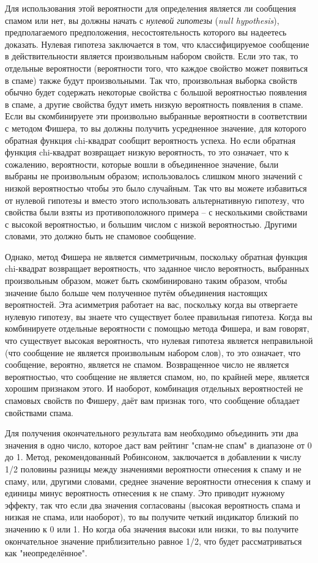 Для использования этой вероятности для определения является ли сообщения спамом или нет,
вы должны начать с \textit{нулевой гипотезы} (\textit{null hypothesis}), предполагаемого
предположения, несостоятельность которого вы надеетесь доказать. Нулевая гипотеза
заключается в том, что классифицируемое сообщение в действительности является произвольным
набором свойств.  Если это так, то отдельные вероятности (вероятности того, что каждое
свойство может появиться в спаме) также будут произвольными.  Так что, произвольная
выборка свойств обычно будет содержать некоторые свойства с большой вероятностью появления
в спаме, а другие свойства будут иметь низкую вероятность появления в спаме.  Если вы
скомбинируете эти произвольно выбранные вероятности в соответствии с методом Фишера, то вы
должны получить усредненное значение, для которого обратная функция chi-квадрат сообщит
вероятность успеха.  Но если обратная функция chi-квадрат возвращает низкую вероятность,
то это означает, что к сожалению, вероятности, которые вошли в объединенное значение, были
выбраны не произвольным образом; использовалось слишком много значений с низкой
вероятностью чтобы это было случайным. Так что вы можете избавиться от нулевой гипотезы и
вместо этого использовать альтернативную гипотезу, что свойства были взяты из
противоположного примера -- с несколькими свойствами с высокой вероятностью, и большим
числом с низкой вероятностью.  Другими словами, это должно быть не спамовое сообщение.

Однако, метод Фишера не является симметричным, поскольку обратная функция chi-квадрат
возвращает вероятность, что заданное число вероятность, выбранных произвольным образом,
может быть скомбинировано таким образом, чтобы значение было больше чем полученное путём
объединения настоящих вероятностей.  Эта асимметрия работает на вас, поскольку когда вы
отвергаете нулевую гипотезу, вы знаете что существует более правильная гипотеза.  Когда вы
комбинируете отдельные вероятности с помощью метода Фишера, и вам говорят, что существует
высокая вероятность, что нулевая гипотеза является неправильной (что сообщение не является
произвольным набором слов), то это означает, что сообщение, вероятно, является не спамом.
Возвращенное число не является вероятностью, что сообщение не является спамом, но, по
крайней мере, является хорошим признаком этого.  И наоборот, комбинация отдельных
вероятностей не спамовых свойств по Фишеру, даёт вам признак того, что сообщение обладает
свойствами спама.

Для получения окончательного результата вам необходимо объединить эти два значения в одно
число, которое даст вам рейтинг "спам-не спам" в диапазоне от 0 до 1.  Метод,
рекомендованный Робинсоном, заключается в добавлении к числу 1/2 половины разницы между
значениями вероятности отнесения к спаму и не спаму, или, другими словами, среднее
значение вероятности отнесения к спаму и единицы минус вероятность отнесения к не спаму.
Это приводит нужному эффекту, так что если два значения согласованы (высокая вероятность
спама и низкая не спама, или наоборот), то вы получите четкий индикатор близкий по
значению к 0 или 1.  Но когда оба значения высоки или низки, то вы получите окончательное
значение приблизительно равное 1/2, что будет рассматриваться как "неопределённое".

